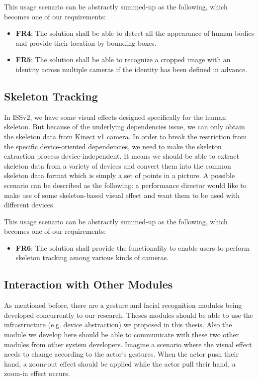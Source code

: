 This usage scenario can be abstractly summed-up as the following, which becomes
one of our requirements:

\begin{itemize}
    \item \textbf{FR4}: The solution shall be able to detect all the appearance 
    of human bodies and provide their location by bounding boxes.
    
    \item \textbf{FR5}: The solution shall be able to recognize a cropped image 
    with an identity across multiple cameras if the identity has been defined
    in advance.
\end{itemize}

\subsection{Skeleton Tracking}
\label{sec:intro-sq-skt}

In ISSv2, we have some visual effects designed specifically for the human 
skeleton. But because of the underlying dependencies issue, we can only obtain 
the skeleton data from Kinect v1 camera.
In order to break the restriction from the specific device-oriented
dependencies, we need to make the skeleton extraction process
device-independent.
It means we should be able to extract skeleton data from a variety
of devices and convert them into the common skeleton data format which is
simply a set of points in a picture. A possible scenario can be described as
the following: a performance director would like to make use of some
skeleton-based visual effect and want them to be used with different devices.

This usage scenario can be abstractly summed-up as the following, which becomes
one of our requirements:

\begin{itemize}
    \item \textbf{FR6}: The solution shall provide the functionality to enable
    users to perform skeleton tracking among various kinds of cameras.
\end{itemize}

\subsection{Interaction with Other Modules}
\label{sec:intro-sq-inta}

As mentioned before, there are a gesture and facial recognition modules being
developed concurrently to our research. Theses modules should be able to use
the infrastructure (e.g. device abstraction) we proposed in this thesis. Also
the module we develop here should be able to communicate with these two other
modules from other system developers. Imagine a scenario where the visual
effect needs to change according to the actor's gestures. When the actor push
their hand, a zoom-out effect should be applied while the actor pull their
hand, a zoom-in effect occurs.

